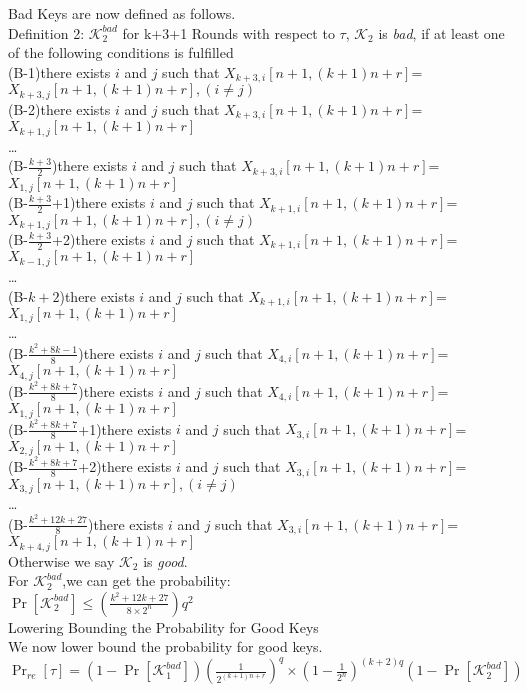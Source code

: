Bad Keys are now defined as follows.\\
Definition 2: $\mathcal{K}_{2}^{bad}$  for k+3+1 Rounds
with respect to $\tau$, $\mathcal{K}_{2}$  is {\it bad}, if at least one of the following conditions is fulfilled\\
(B-1)there exists $i$ and $j$ such that $X_{k+3,i}[n+1,(k+1)n+r]$=$X_{k+3,j}[n+1,(k+1)n+r],(i\neq j)$\\
(B-2)there exists $i$ and $j$ such that $X_{k+3,i}[n+1,(k+1)n+r]$=$X_{k+1,j}[n+1,(k+1)n+r]$\\
\dots\\
(B-$\frac{k+3}{2}$)there exists $i$ and $j$ such that $X_{k+3,i}[n+1,(k+1)n+r]$=$X_{1,j}[n+1,(k+1)n+r]$\\
(B-$\frac{k+3}{2}$+1)there exists $i$ and $j$ such that $X_{k+1,i}[n+1,(k+1)n+r]$=$X_{k+1,j}[n+1,(k+1)n+r],(i\neq j)$\\
(B-$\frac{k+3}{2}$+2)there exists $i$ and $j$ such that $X_{k+1,i}[n+1,(k+1)n+r]$=$X_{k-1,j}[n+1,(k+1)n+r]$\\
\dots \\
(B-$k+2$)there exists $i$ and $j$ such that $X_{k+1,i}[n+1,(k+1)n+r]$=$X_{1,j}[n+1,(k+1)n+r]$\\
\dots \\
(B-$\frac{k^{2}+8k-1}{8}$)there exists $i$ and $j$ such that $X_{4,i}[n+1,(k+1)n+r]$=$X_{4,j}[n+1,(k+1)n+r]$\\
(B-$\frac{k^{2}+8k+7}{8}$)there exists $i$ and $j$ such that $X_{4,i}[n+1,(k+1)n+r]$=$X_{1,j}[n+1,(k+1)n+r]$\\
(B-$\frac{k^{2}+8k+7}{8}$+1)there exists $i$ and $j$ such that $X_{3,i}[n+1,(k+1)n+r]$=$X_{2,j}[n+1,(k+1)n+r]$\\
(B-$\frac{k^{2}+8k+7}{8}$+2)there exists $i$ and $j$ such that $X_{3,i}[n+1,(k+1)n+r]$=$X_{3,j}[n+1,(k+1)n+r],(i\neq j)$\\
\dots\\
(B-$\frac{k^{2}+12k+27}{8}$)there exists $i$ and $j$ such that $X_{3,i}[n+1,(k+1)n+r]$=$X_{k+4,j}[n+1,(k+1)n+r]$\\
Otherwise we say $\mathcal{K}_{2}$ is {\it good}.\\
For $\mathcal{K}_{2}^{bad}$,we can get the probability:\\
$\Pr[\mathcal{K}_{2}^{bad}]\leq (\frac{k^{2}+12k+27}{8\times2^{n}})q^{2}$\\

Lowering Bounding the Probability for Good Keys\\
We now lower bound the probability for good keys.\\
$\Pr_{re}[\tau]=(1-\Pr[\mathcal{K}_{1}^{bad}])(\frac{1}{2^{(k+1)n+r}})^{q}\times(1-\frac{1}{2^{n}})^{(k+2)q}
(1-\Pr[\mathcal{K}_{2}^{bad}])$

